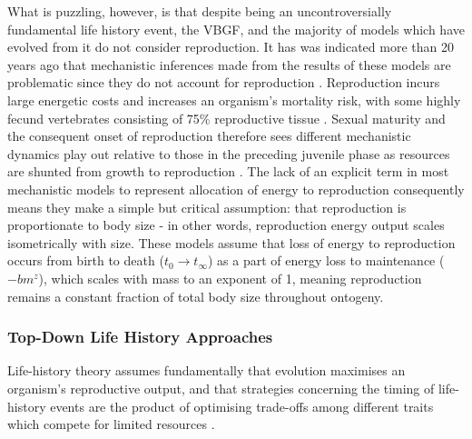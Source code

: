 \documentclass[a4paper]{article} %
\begin{document}
        What is puzzling, however, is that despite being an uncontroversially fundamental life history event, the VBGF, and the majority of models which have evolved from it do not consider reproduction. It has was indicated more than 20 years ago that mechanistic inferences made from the results of these models are problematic since they do not account for reproduction \autocite{Day1997, Marshall2019b}. Reproduction incurs large energetic costs and increases an organism's mortality risk, with some highly fecund vertebrates consisting of 75\% reproductive tissue \autocite{Parker2018}. Sexual maturity and the consequent onset of reproduction therefore sees different mechanistic dynamics play out relative to those in the preceding juvenile phase as resources are shunted from growth to reproduction \autocite{Day1997}. The lack of an explicit term in most mechanistic models to represent allocation of energy to reproduction consequently means they make a simple but critical assumption: that reproduction is proportionate to body size - in other words, reproduction energy output scales isometrically with size. These models assume that loss of energy to reproduction occurs from birth to death ($t_0 \rightarrow t_{\infty}$) as a part of energy loss to maintenance ($-bm^z$), which scales with mass to an exponent of 1, meaning reproduction remains a constant fraction of total body size throughout ontogeny.

        \subsubsection{Top-Down Life History Approaches}
        Life-history theory assumes fundamentally that evolution maximises an organism's reproductive output, and that strategies concerning the timing of life-history events are the product of optimising trade-offs among different traits which compete for limited resources \autocite{Day1997, Stearns1989, stearns1992evolution}.      
\end{document}
